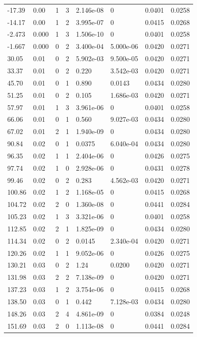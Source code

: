 \documentclass[preview]{standalone}
\begin{document}
{{\begin{tabular}{L{1.2cm}C{1.2cm} C{0.3cm}C{0.5cm} C{1.4cm}C{1.4cm} C{1.4cm}C{1.4cm}}
  -17.39  &  0.00  & 1     &  3 &  2.146e-08  & 0  & 0.0401 &  0.0258   \\ 
  -14.17  &  0.00  & 1     &  2 &  3.995e-07  & 0  & 0.0415 &  0.0268   \\ 
  -2.473  &  0.000  & 1     &  3 &  1.506e-10  & 0  & 0.0401 &  0.0258   \\ 
  -1.667  &  0.000  & 0     &  2 &  3.400e-04  & 5.000e-06  & 0.0420 &  0.0271   \\ 
  30.05  &  0.01  & 0     &  2 &  5.902e-03  & 9.500e-05  & 0.0420 &  0.0271   \\ 
  33.37  &  0.01  & 0     &  2 &  0.220  & 3.542e-03  & 0.0420 &  0.0271   \\ 
  45.70  &  0.01  & 0     &  1 &  0.890  & 0.0143  & 0.0434 &  0.0280   \\ 
  51.25  &  0.01  & 0     &  2 &  0.105  & 1.686e-03  & 0.0420 &  0.0271   \\ 
  57.97  &  0.01  & 1     &  3 &  3.961e-06  & 0  & 0.0401 &  0.0258   \\ 
  66.06  &  0.01  & 0     &  1 &  0.560  & 9.027e-03  & 0.0434 &  0.0280   \\ 
  67.02  &  0.01  & 2     &  1 &  1.940e-09  & 0  & 0.0434 &  0.0280   \\ 
  90.84  &  0.02  & 0     &  1 &  0.0375  & 6.040e-04  & 0.0434 &  0.0280   \\ 
  96.35  &  0.02  & 1     &  1 &  2.404e-06  & 0  & 0.0426 &  0.0275   \\ 
  97.74  &  0.02  & 1     &  0 &  2.928e-06  & 0  & 0.0431 &  0.0278   \\ 
  99.46  &  0.02  & 0     &  2 &  0.283  & 4.562e-03  & 0.0420 &  0.0271   \\ 
  100.86  &  0.02  & 1     &  2 &  1.168e-05  & 0  & 0.0415 &  0.0268   \\ 
  104.72  &  0.02  & 2     &  0 &  1.360e-08  & 0  & 0.0441 &  0.0284   \\ 
  105.23  &  0.02  & 1     &  3 &  3.321e-06  & 0  & 0.0401 &  0.0258   \\ 
  112.85  &  0.02  & 2     &  1 &  1.825e-09  & 0  & 0.0434 &  0.0280   \\ 
  114.34  &  0.02  & 0     &  2 &  0.0145  & 2.340e-04  & 0.0420 &  0.0271   \\ 
  120.26  &  0.02  & 1     &  1 &  9.052e-06  & 0  & 0.0426 &  0.0275   \\ 
  130.21  &  0.03  & 0     &  2 &  1.24  & 0.0200  & 0.0420 &  0.0271   \\ 
  131.98  &  0.03  & 2     &  2 &  7.138e-09  & 0  & 0.0420 &  0.0271   \\ 
  137.23  &  0.03  & 1     &  2 &  3.754e-06  & 0  & 0.0415 &  0.0268   \\ 
  138.50  &  0.03  & 0     &  1 &  0.442  & 7.128e-03  & 0.0434 &  0.0280   \\ 
  148.26  &  0.03  & 2     &  4 &  4.861e-09  & 0  & 0.0384 &  0.0248   \\ 
  151.69  &  0.03  & 2     &  0 &  1.113e-08  & 0  & 0.0441 &  0.0284   \\ 
\hline 
\end{tabular} 

}}
\end{document}
